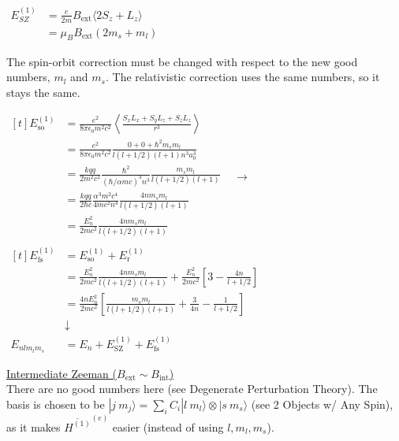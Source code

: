 \documentclass[12pt]{article}
\begin{document}
\begin{center} \(\begin{aligned}
    E_{SZ}^{(1)} &= \frac{e}{2m} B_\text{ext} \langle 2S_z + L_z \rangle\\[5pt]
    &= \mu_B B_\text{ext} (2m_s + m_l)
\end{aligned}\) \end{center}

\noindent
The spin-orbit correction must be changed with respect to the new good numbers, \(m_l\) and \(m_s\). 
The relativistic correction uses the same numbers, so it stays the same.

\vspace{15pt}\noindent
\(\begin{aligned}[t]
    E_\text{so}^{(1)} &= \frac{e^2}{8 \pi \epsilon_0 m^2 c^2} 
        \left\langle \frac{S_x L_x + S_y L_z + S_z L_z}{r^3} \right\rangle \\[5pt]
    &= \frac{e^2}{8 \pi \epsilon_0 m^2 c^2} \frac{0 + 0 + \hbar^2 m_s m_l}{l (l+1/2) (l+1) n^3 a_0^3}\\[15pt]
    &= \frac{kqq}{2 m^2 c^2} \frac{\hbar^2}{(\hbar / \alpha m c)^3 n^3}\frac{m_s m_l}{l (l+1/2) (l+1)}\\[5pt]
    &= \frac{kqq}{2\hbar c} \frac{\alpha^3 m^2 c^4}{4 mc^2 n^4}\frac{4n m_s m_l}{l (l+1/2) (l+1)}\\[5pt]
    &= \frac{E_n^2}{2mc^2} \frac{4n m_s m_l}{l (l+1/2) (l+1)}\\
\end{aligned}\)
\(\ \ \rightarrow \ \)
\(\begin{aligned}[t]
    E_\text{fs}^{(1)} &= E_\text{so}^{(1)} + E_\text{r}^{(1)}\\[5pt]
    &= \frac{E_n^2}{2mc^2} \frac{4n m_s m_l}{l (l+1/2) (l+1)}
        + \frac{E_n^2}{2mc^2} \left[ 3 - \frac{4n}{l + 1/2} \right]\\[5pt]
    &= \frac{4n E_n^2}{2mc^2} \left[ \frac{m_s m_l}{l (l+1/2) (l+1)} 
        + \frac{3}{4n} - \frac{1}{l + 1/2} \right]\\
    &\downarrow\\
    E_{nlm_lm_s} &= E_n + E_\text{SZ}^{(1)} + E_\text{fs}^{(1)}
\end{aligned}\)

\vspace{25pt}\noindent
\underline{Intermediate Zeeman (\(B_\text{ext} \sim B_\text{int}\))}\\[10pt]
There are no good numbers here (see Degenerate Perturbation Theory). The basis is chosen to be 
\(|j \ m_j \rangle = \sum_i C_i |l\ m_l \rangle \otimes |s\ m_s \rangle\) (see 2 Objects w/ Any Spin), as it makes
\(\overline{H^{(1)}}^{(e)}\) easier (instead of using \(l, m_l, m_s\)).
\end{document}
